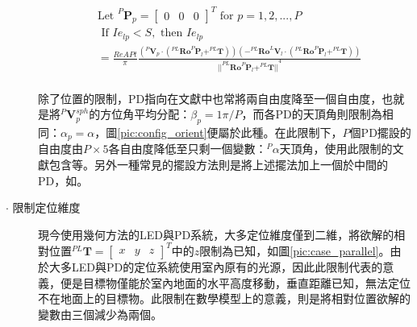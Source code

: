 \begin{description}
        \begin{equation}
            \label{eqn:model_config_restrict}
            \begin{aligned}
                &\text{Let }
                ^P\boldsymbol{P}_p=
                \left[\begin{array}{ccc}0&0&0\end{array}\right]^T
                \text{ for } p = 1,2,...,P\\
                &\text { If } Ie_{lp}<S ,\text{ then }Ie_{lp} \\
                    &= \frac{ReAPt}{ \pi}
                \frac{
                        {( ^{P}\boldsymbol{V}_p \cdot 
                            (
                                ^{PL} \boldsymbol{Ro}^{P}\boldsymbol{P}_l
                                + ^{PL}\boldsymbol{T}
                            )
                        )}
                {
                            (
                                -^{PL}\boldsymbol{Ro}^{L}\boldsymbol{V}_l 
                                \cdot 
                                (
                                    ^{PL}\boldsymbol{Ro}^{P}\boldsymbol{P}_l
                                    +^{PL}\boldsymbol{T}
                                )
                            )
                        } } 
                    {
                        {
                            ||
                                ^{PL}\boldsymbol{Ro}^{P}\boldsymbol{P}_l+^{PL}\boldsymbol{T}
                            ||
                        }^{4}
                    }\\
            \end{aligned}
        \end{equation}

        \qquad
        除了位置的限制，PD指向在文獻中也常將兩自由度降至一個自由度，也就是將$^P\boldsymbol{V}_p^{sph}$的方位角平均分配：$\beta_p = 1\pi/P$，而各PD的天頂角則限制為相同：$\alpha_p = \alpha$，圖\ref{pic:config_orient}便屬於此種。在此限制下，$P$個PD擺設的自由度由$P\times5$各自由度降低至只剩一個變數：$^P \alpha$天頂角，使用此限制的文獻包含\cite{case:cart2d}\cite{case:cart3d}\cite{case:3d_layers}等。另外一種常見的擺設方法則是將上述擺法加上一個於中間的PD，如\cite{case:ml}。

        \item[$\cdot$ 限制定位維度]\hfill
        
        \qquad 
        現今使用幾何方法的LED與PD系統，大多定位維度僅到二維\cite{survey_light2018}，將欲解的相對位置$^{PL}\boldsymbol{T}=\left[\begin{array}{ccc}x&y&z\end{array}\right]^T$中的$z$限制為已知，如圖\ref{pic:case_parallel}。由於大多LED與PD的定位系統使用室內原有的光源，因此此限制代表的意義，便是目標物僅能於室內地面的水平高度移動，垂直距離已知，無法定位不在地面上的目標物。此限制在數學模型上的意義，則是將相對位置欲解的變數由三個減少為兩個。


\end{description}
